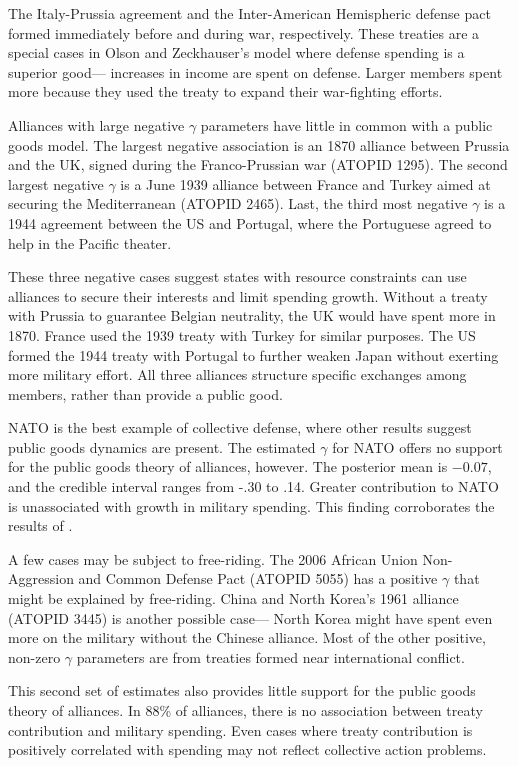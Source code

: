 \documentclass[12pt]{article}
\begin{document}
The Italy-Prussia agreement and the Inter-American Hemispheric defense pact formed immediately before and during war, respectively. 
These treaties are a special cases in Olson and Zeckhauser's model where defense spending is a superior good--- increases in income are spent on defense. 
Larger members spent more because they used the treaty to expand their war-fighting efforts. 


Alliances with large negative $\gamma$ parameters have little in common with a public goods model. 
The largest negative association is an 1870 alliance between Prussia and the UK, signed during the Franco-Prussian war (ATOPID 1295). 
The second largest negative $\gamma$ is a June 1939 alliance between France and Turkey aimed at securing the Mediterranean (ATOPID 2465).
Last, the third most negative $\gamma$ is a 1944 agreement between the US and Portugal, where the Portuguese agreed to help in the Pacific theater. 


These three negative cases suggest states with resource constraints can use alliances to secure their interests and limit spending growth. 
Without a treaty with Prussia to guarantee Belgian neutrality, the UK would have spent more in 1870.
France used the 1939 treaty with Turkey for similar purposes. 
The US formed the 1944 treaty with Portugal to further weaken Japan without exerting more military effort. 
All three alliances structure specific exchanges among members, rather than provide a public good. 


NATO is the best example of collective defense, where other results suggest public goods dynamics are present. 
The estimated $\gamma$ for NATO offers no support for the public goods theory of alliances, however. 
The posterior mean is $-0.07$, and the credible interval ranges from -.30 to .14.  
Greater contribution to NATO is unassociated with growth in military spending. 
This finding corroborates the results of \citet{PluemperNeumayer2015}. 


A few cases may be subject to free-riding. 
The 2006 African Union Non-Aggression and Common Defense Pact (ATOPID 5055) has a positive $\gamma$ that might be explained by free-riding.  
China and North Korea's 1961 alliance (ATOPID 3445) is another possible case--- North Korea might have spent even more on the military without the Chinese alliance. 
Most of the other positive, non-zero $\gamma$ parameters are from treaties formed near international conflict. 


This second set of estimates also provides little support for the public goods theory of alliances. 
In 88\% of alliances, there is no association between treaty contribution and military spending. 
Even cases where treaty contribution is positively correlated with spending may not reflect collective action problems. 
\end{document}
